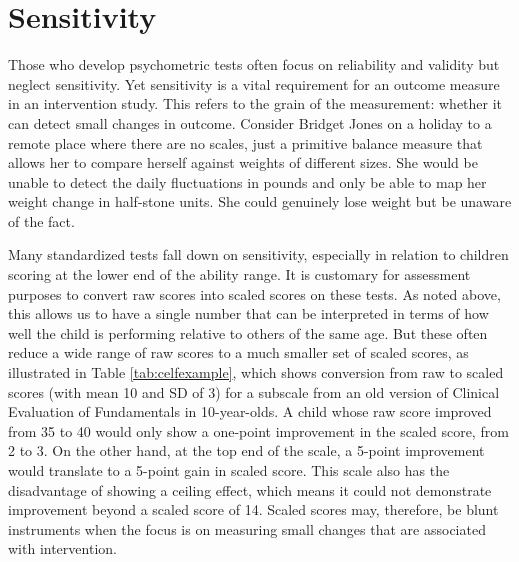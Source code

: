 \documentclass{krantz}
\begin{document}
\hypertarget{sensitivity}{%
\section{Sensitivity}\label{sensitivity}}

Those who develop psychometric tests often focus on reliability and validity but neglect sensitivity. Yet sensitivity is a vital requirement for an outcome measure in an intervention study. This refers to the grain of the measurement: whether it can detect small changes in outcome. Consider Bridget Jones on a holiday to a remote place where there are no scales, just a primitive balance measure that allows her to compare herself against weights of different sizes. She would be unable to detect the daily fluctuations in pounds and only be able to map her weight change in half-stone units. She could genuinely lose weight but be unaware of the fact.

Many standardized tests fall down on sensitivity, especially in relation to children scoring at the lower end of the ability range. It is customary for assessment purposes to convert raw scores into scaled scores on these tests. As noted above, this allows us to have a single number that can be interpreted in terms of how well the child is performing relative to others of the same age. But these often reduce a wide range of raw scores to a much smaller set of scaled scores, as illustrated in Table \ref{tab:celfexample}, which shows conversion from raw to scaled scores (with mean 10 and SD of 3) for a subscale from an old version of Clinical Evaluation of Fundamentals in 10-year-olds. A child whose raw score improved from 35 to 40 would only show a one-point improvement in the scaled score, from 2 to 3. On the other hand, at the top end of the scale, a 5-point improvement would translate to a 5-point gain in scaled score. This scale also has the disadvantage of showing a ceiling effect, which means it could not demonstrate improvement beyond a scaled score of 14. Scaled scores may, therefore, be blunt instruments when the focus is on measuring small changes that are associated with intervention.
\end{document}
